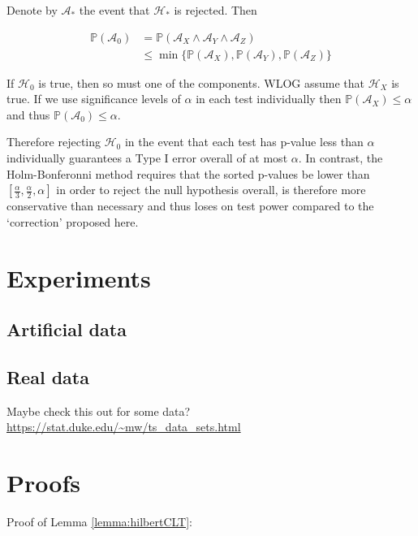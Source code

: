 \documentclass{article}
\begin{document}
Denote by $\mathcal{A}_*$ the event that $\mathcal{H}_*$ is rejected. Then

\begin{align*}
\mathbb{P}(\mathcal{A}_0) &= \mathbb{P}(\mathcal{A}_X \land \mathcal{A}_Y \land \mathcal{A}_Z) \\
&\leq \min\{\mathbb{P}(\mathcal{A}_X), \mathbb{P}(\mathcal{A}_Y), \mathbb{P}(\mathcal{A}_Z)\}
\end{align*}

If $\mathcal{H}_0$ is true, then so must one of the components. WLOG assume that $\mathcal{H}_X$ is true. If we use significance levels of $\alpha$ in each test individually then $\mathbb{P}(\mathcal{A}_X) \leq \alpha$ and thus $\mathbb{P}(\mathcal{A}_0) \leq \alpha$.

Therefore rejecting $\mathcal{H}_0$ in the event that each test has p-value less than $\alpha$ individually guarantees a Type I error overall of at most $\alpha$. In contrast, the Holm-Bonferonni method requires that the sorted p-values be lower than $[\frac{\alpha}{3},\frac{\alpha}{2},\alpha]$ in order to reject the null hypothesis overall, is therefore more conservative than necessary and thus loses on test power compared to the `correction' proposed here.

\section{Experiments}
\subsection{Artificial data}
\subsection{Real data}
Maybe check this out for some data? \url{https://stat.duke.edu/~mw/ts_data_sets.html}

\section{Proofs}


Proof of Lemma \ref{lemma:hilbertCLT}:
\end{document}

